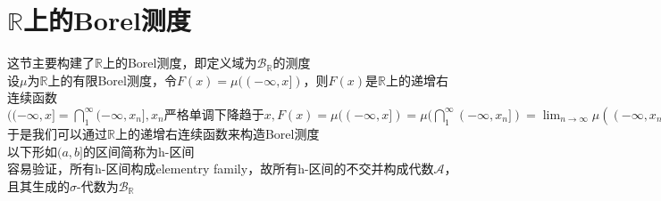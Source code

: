 \documentclass[12pt, a4paper, oneside]{ctexbook}
\begin{document}
\section{$\mathbb{R}$上的Borel测度}

这节主要构建了$\mathbb{R}$上的Borel测度，即定义域为$\mathcal{B}_{\mathbb{R}}$的测度\\
设$\mu$为$\mathbb{R}$上的有限Borel测度，令$F(x)=\mu((-\infty,x])$，则$F(x)$是$\mathbb{R}$上的递增右连续函数
$((-\infty,x]=\bigcap_1^{\infty}(-\infty,x_n],x_n\text{严格单调下降趋于}x,F(x)=\mu((-\infty,x])
=\mu(\bigcap_1^{\infty}(-\infty,x_n])=\lim_{n\to\infty}\mu((-\infty,x_n])=\lim_{n\to\infty}F(x_n),\text{由海涅定理知}F\text{右连续})$\\
于是我们可以通过$\mathbb{R}$上的递增右连续函数来构造Borel测度\\
以下形如$(a,b]$的区间简称为h-区间\\
容易验证，所有h-区间构成elementry family，故所有h-区间的不交并构成代数$\mathcal{A}$，且其生成的$\sigma$-代数为$\mathcal{B}_{\mathbb{R}}$\\
\end{document}
